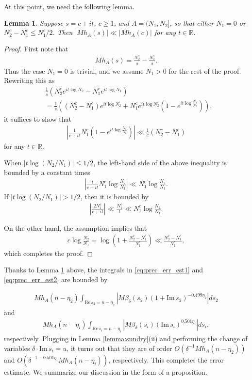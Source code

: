 \documentclass[11pt]{amsart}
\def\R{\mathbb{R}}
\newtheorem{lemma}[theorem]{Lemma}
\numberwithin{theorem}{section}
\numberwithin{equation}{section}
\theoremstyle{remark}
\theoremstyle{definition}
\newcommand{\re}{\mathrm{Re}\,}
\newcommand{\im}{\mathrm{Im}\,}
\begin{document}
At this point, we need the following lemma.

\begin{lemma} \label{lemma:mellin}
Suppose $s = c + it$, $c \geq 1$, and $A = (N_1,N_2]$, so that either $N_1=0$ or $N_2^c - N_1^c \leq N_1^c/2$. Then $|Mh_A(s)| \ll |Mh_A(c)|$ for any $t \in \R$.
\end{lemma}
\begin{proof}
First note that
\begin{align*}
Mh_A(s) = \frac{N_2^s}{s}-\frac{N_1^s}{s}.
\end{align*}
Thus the case $N_1=0$ is trivial, and we assume $N_1 > 0$ for the rest of the proof.
Rewriting this as
\begin{align*}
&\frac{1}{s}\left(N_2^ce^{it\log N_2} - N_1^ce^{it\log N_1}\right) \\
&= \frac{1}{s}\left((N_2^c-N_1^c)e^{it\log N_2} + N_1^ce^{it\log N_2}(1-e^{it\log\frac{N_1}{N_2}})\right),
\end{align*}
it suffices to show that
\begin{align*}
\left|\frac{1}{c+it}N_1^c(1-e^{it\log\frac{N_1}{N_2}})\right| \ll \frac{1}{c}(N_2^c-N_1^c)
\end{align*}
for any $t \in \R$.

When $|t\log(N_2/N_1)| \leq 1/2$, the left-hand side of the above inequality is bounded by a constant times
\begin{align*}
\left|\frac{t}{c+it}N_1^c\log\frac{N_2}{N_1}\right| \ll N_1^c\log\frac{N_2}{N_1}.
\end{align*}
If $|t\log(N_2/N_1)| > 1/2$, then it is bounded by
\begin{align*}
\left|\frac{2N_1^c}{c+it}\right| \ll \frac{N_1^c}{t} \ll N_1^c\log\frac{N_2}{N_1}.
\end{align*}

On the other hand, the assumption implies that
\begin{align*}
c\log \frac{N_2}{N_1} = \log\left(1+\frac{N_2^c-N_1^c}{N_1^c}\right) \ll \frac{N_2^c-N_1^c}{N_1^c},
\end{align*}
which completes the proof.
\end{proof}

Thanks to Lemma \ref{lemma:mellin} above, the integrals in \eqref{eq:prec_err_est1} and \eqref{eq:prec_err_est2} are bounded by

\begin{align*}
Mh_A(n-\eta_2)\int_{\re s_2=n-\eta_2} \left|M\beta_\delta(s_2) (1+\im s_2)^{-0.499\eta_2}\right|ds_2
\end{align*}
and
\begin{align*}
Mh_A(n-\eta_i)\int_{\re s_i=n-\eta_i} \left|M\beta_\delta(s_i) (\im s_i)^{0.501\eta_i}\right|ds_i,
\end{align*}
respectively. Plugging in Lemma \ref{lemma:sundry}(ii) and performing the change of variables $\delta \cdot \im s_i = u$, it turns out that they are of order $O(\delta^{-1}Mh_A(n-\eta_2))$ and $O(\delta^{-1-0.501\eta_i}Mh_A(n-\eta_i))$, respectively. This completes the error estimate. We summarize our discussion in the form of a proposition.
\end{document}
